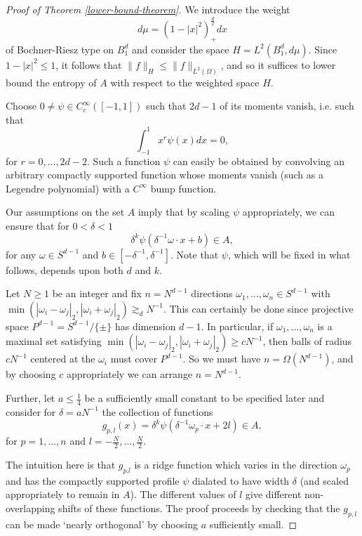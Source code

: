 \begin{proof}[Proof of Theorem \ref{lower-bound-theorem}]
 We introduce the weight $$d\mu = (1-|x|^2)_+^{\frac{d}{2}}dx$$ of Bochner-Riesz type on $B_1^d$ and consider the space $H = L^2(B_1^d,d\mu)$. Since $1-|x|^2 \leq 1$, it follows that
 $\|f\|_H \leq \|f\|_{L^2(\Omega)}$, and so it suffices to lower bound the entropy of $A$ with respect to the weighted space $H$.
 
 Choose $0\neq \psi\in C^\infty_c([-1,1])$ such that $2d-1$ of its moments vanish, i.e. such that
 \begin{equation}
  \int_{-1}^1 x^r\psi(x)dx = 0,
 \end{equation}
 for $r=0,...,2d-2$. Such a function $\psi$ can easily be obtained by convolving an arbitrary compactly supported function whose moments vanish (such as a Legendre polynomial) with a $C^\infty$ bump function.
 
 Our assumptions on the set $A$ imply that by scaling $\psi$ appropriately, we can ensure that for $0 < \delta < 1$
 \begin{equation}
   \delta^{k}\psi(\delta^{-1}\omega\cdot x + b)\in A,
  \end{equation}
 for any $\omega\in S^{d-1}$ and $b\in[-\delta^{-1},\delta^{-1}]$. Note that $\psi$, which will be fixed in what follows, depends upon both $d$ and $k$.
 
 Let $N \geq 1$ be an integer and fix $n = N^{d-1}$ directions $\omega_1,...,\omega_n\in S^{d-1}$ with $\min(|\omega_i - \omega_j|_2, |\omega_i + \omega_j|_2) \gtrsim_d N^{-1}$. This can certainly be done since projective space $P^{d-1} = S^{d-1}/\{\pm\}$ has dimension $d-1$. In particular, if $\omega_1,...,\omega_n$ is a maximal set satisfying $\min(|\omega_i - \omega_j|_2, |\omega_i + \omega_j|_2) \geq cN^{-1}$, then balls of radius $cN^{-1}$ centered at the $\omega_i$ must cover $P^{d-1}$. So we must have $n = \Omega(N^{d-1})$, and by choosing $c$ appropriately we can arrange $n = N^{d-1}$.
 
 Further, let $a \leq \frac{1}{4}$ be a sufficiently small constant to be specified later and consider for $\delta = aN^{-1}$ the collection of functions
 \begin{equation}
  g_{p,l}(x) = \delta^{k}\psi(\delta^{-1}\omega_p \cdot x + 2l)\in A,
 \end{equation}
 for $p=1,...,n$ and $l = -\frac{N}{2},...,\frac{N}{2}$. 
 
 The intuition here is that $g_{p.l}$ is a ridge function which varies in the direction $\omega_p$ and has the compactly supported profile $\psi$ dialated to have width $\delta$ (and scaled appropriately to remain in $A$). The different values of $l$ give different non-overlapping shifts of these functions.  The proof proceeds by checking that the $g_{p,l}$ can be made `nearly orthogonal' by choosing $a$ sufficiently small.
 

\end{proof}
